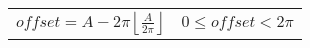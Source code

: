 \documentclass[
  border=2,
  convert={
    density=100 -alpha remove,
    outext=.png
  },
]{standalone}
\begin{document}
\begin{tabular}{l l}
  $
    \displaystyle \mathit{offset}
      = A - 2\pi \left\lfloor \frac{A}{2\pi} \right\rfloor
  $ & $
    0 \leq \mathit{offset} < 2\pi
  $
\end{tabular}
\end{document}
